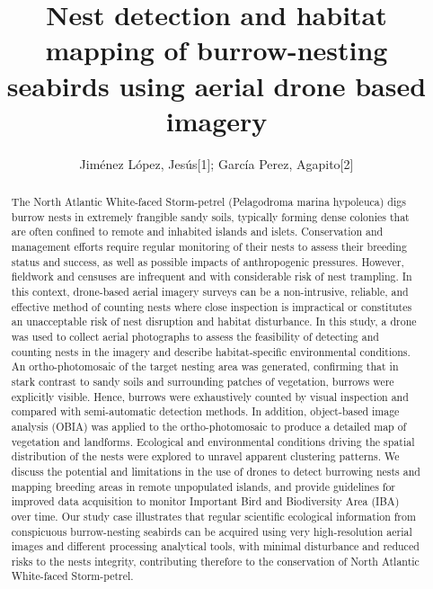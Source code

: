 \documentclass[12pt]{article}
\begin{document}
\title{Nest detection and habitat mapping of burrow-nesting seabirds using aerial drone based imagery}

\author{Jiménez López, Jesús[1]; García Perez, Agapito[2]}


\maketitle
\begin{abstract}
The North Atlantic White-faced Storm-petrel (Pelagodroma marina hypoleuca) digs burrow nests in extremely frangible sandy soils, typically forming dense colonies that are often confined to remote and inhabited islands and islets. Conservation and management efforts require regular monitoring of their nests to assess their breeding status and success, as well as possible impacts of anthropogenic pressures. However, fieldwork and censuses are infrequent and with considerable risk of nest trampling. In this context, drone-based aerial imagery surveys can be a non-intrusive, reliable, and effective method of counting nests where close inspection is impractical or constitutes an unacceptable risk of nest disruption and habitat disturbance. In this study, a drone was used to collect aerial photographs to assess the feasibility of detecting and counting nests in the imagery and describe habitat-specific environmental conditions. An ortho-photomosaic of the target nesting area was generated, confirming that in stark contrast to sandy soils and surrounding patches of vegetation, burrows were explicitly visible. Hence, burrows were exhaustively counted by visual inspection and compared with semi-automatic detection methods. In addition, object-based image analysis (OBIA) was applied to the ortho-photomosaic to produce a detailed map of vegetation and landforms. Ecological and environmental conditions driving the spatial distribution of the nests were explored to unravel apparent clustering patterns. We discuss the potential and limitations in the use of drones to detect burrowing nests and mapping breeding areas in remote unpopulated islands, and provide guidelines for improved data acquisition to monitor Important Bird and Biodiversity Area (IBA) over time. Our study case illustrates that regular scientific ecological information from conspicuous burrow-nesting seabirds can be acquired using very high-resolution aerial images and different processing analytical tools, with minimal disturbance and reduced risks to the nests integrity, contributing therefore to the conservation of North Atlantic White-faced Storm-petrel.

\end{abstract}
\end{document}

